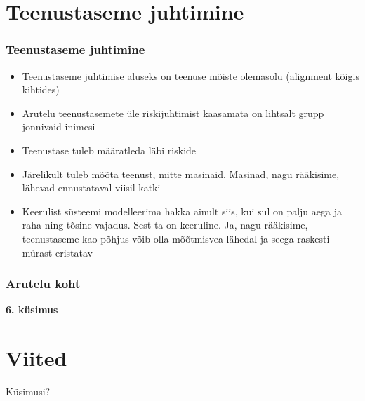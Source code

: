 \section{Teenustaseme juhtimine}
\begin{frame}[fragile]
  \frametitle{Teenustaseme juhtimine}
	\begin{itemize}
		\item Teenustaseme juhtimise aluseks on teenuse mõiste olemasolu (alignment kõigis kihtides)
		\item Arutelu teenustasemete üle riskijuhtimist kaasamata on lihtsalt grupp jonnivaid inimesi
		\item Teenustase tuleb määratleda läbi riskide
		\item Järelikult tuleb mõõta teenust, mitte masinaid. Masinad, nagu rääkisime, lähevad ennustataval viisil katki
		\item Keerulist süsteemi modelleerima hakka ainult siis, kui sul on palju aega ja raha ning tõsine vajadus. Sest ta on keeruline. Ja, nagu rääkisime, teenustaseme kao põhjus võib olla mõõtmisvea lähedal ja seega raskesti mürast eristatav
	\end{itemize}
\end{frame}


\begin{frame}[fragile]
  \frametitle{Arutelu koht}
		\begin{center}
			\textbf{6. küsimus}
		\end{center}
\end{frame}


\section{Viited}

\begin{frame}[t,allowframebreaks,]
  	
	 

\end{frame}

\begin{frame}[plain]
	\begin{center}Küsimusi?\end{center}
\end{frame}


